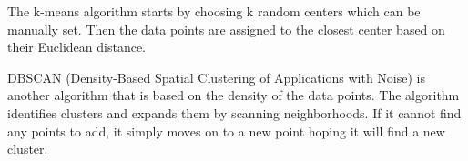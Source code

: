 The k-means algorithm starts by choosing k random centers which can be manually set. Then the data points are assigned to the closest center based on their Euclidean distance.

DBSCAN (Density-Based Spatial Clustering of Applications with Noise) is another algorithm that is based on the density of the data points. The algorithm identifies clusters and expands them by scanning neighborhoods. If it cannot find any points to add, it simply moves on to a new point hoping it will find a new cluster.
